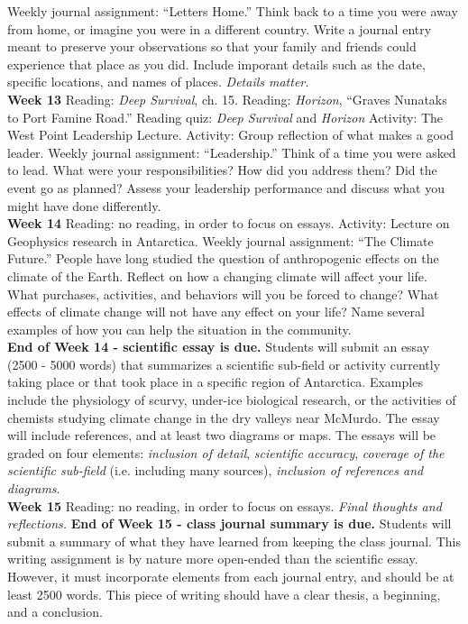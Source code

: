 \documentclass[10pt]{article}
\begin{document}
\begin{outline}[enumerate]
\2 Weekly journal assignment: ``Letters Home.'' Think back to a time you were away from home, or imagine you were in a different country.  Write a journal entry meant to preserve your observations so that your family and friends could experience that place as you did.  Include imporant details such as the date, specific locations, and names of places.  \textit{Details matter.} \\
\1 \textbf{Week 13}
\2 Reading: \textit{Deep Survival}, ch. 15.
\2 Reading: \textit{Horizon}, ``Graves Nunataks to Port Famine Road.''
\2 Reading quiz: \textit{Deep Survival} and \textit{Horizon}
\2 Activity: The West Point Leadership Lecture.
\2 Activity: Group reflection of what makes a good leader.
\2 Weekly journal assignment: ``Leadership.'' Think of a time you were asked to lead.  What were your responsibilities?  How did you address them?  Did the event go as planned?  Assess your leadership performance and discuss what you might have done differently. \\
\1 \textbf{Week 14}
\2 Reading: no reading, in order to focus on essays.
\2 Activity: Lecture on Geophysics research in Antarctica.
\2 Weekly journal assignment: ``The Climate Future.'' People have long studied the question of anthropogenic effects on the climate of the Earth.  Reflect on how a changing climate will affect your life.  What purchases, activities, and behaviors will you be forced to change?  What effects of climate change will not have any effect on your life?  Name several examples of how you can help the situation in the community. \\
\2 \textbf{End of Week 14 - scientific essay is due.} Students will submit an essay (2500 - 5000 words) that summarizes a scientific sub-field or activity currently taking place or that took place in a specific region of Antarctica.  Examples include the physiology of scurvy, under-ice biological research, or the activities of chemists studying climate change in the dry valleys near McMurdo.  The essay will include references, and at least two diagrams or maps.  The essays will be graded on four elements: \textit{inclusion of detail}, \textit{scientific accuracy}, \textit{coverage of the scientific sub-field} (i.e. including many sources), \textit{inclusion of references and diagrams}. \\
\1 \textbf{Week 15}
\2 Reading: no reading, in order to focus on essays.
\2 \textit{Final thoughts and reflections.}
\2 \textbf{End of Week 15 - class journal summary is due.} Students will submit a summary of what they have learned from keeping the class journal.  This writing assignment is by nature more open-ended than the scientific essay.  However, it must incorporate elements from each journal entry, and should be at least 2500 words.  This piece of writing should have a clear thesis, a beginning, and a conclusion.
\end{outline}
\end{document}
